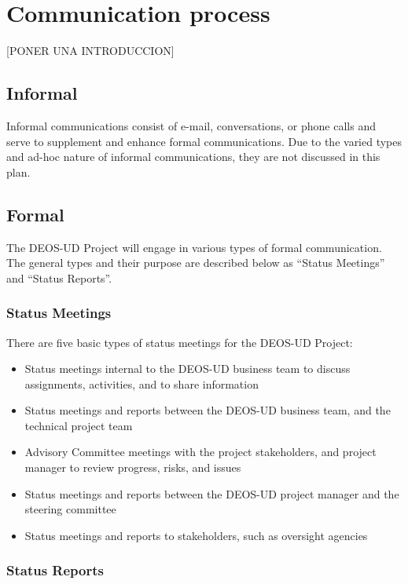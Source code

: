 \section{Communication process}

[PONER UNA INTRODUCCION]

\subsection{Informal}

Informal communications consist of e-mail, conversations, or phone calls and serve to supplement and enhance formal communications. Due to the varied types and ad-hoc nature of informal communications, they are not discussed in this plan.

\subsection{Formal}

The DEOS-UD Project will engage in various types of formal communication. The general types and their purpose are described below as “Status Meetings” and “Status Reports”.

\subsubsection{Status Meetings}

There are five basic types of status meetings for the DEOS-UD Project:
 \begin{itemize}
	\item Status meetings internal to the DEOS-UD business team to discuss assignments, activities, and to share information
	\item Status meetings and reports between the DEOS-UD business team, and the technical project team
	\item Advisory Committee meetings with the project stakeholders, and project manager to review progress, risks, and issues
	\item Status meetings and reports between the DEOS-UD project manager and the steering committee
	\item Status meetings and reports to stakeholders, such as oversight agencies
 \end{itemize}

\subsubsection{Status Reports}


